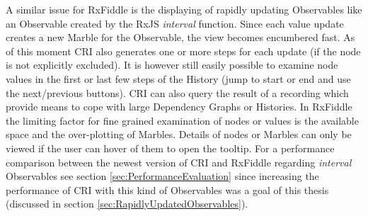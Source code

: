 	A similar issue for RxFiddle is the displaying of rapidly updating Observables like an Observable created by the RxJS \emph{interval} function. Since each value update creates a new Marble for the Observable, the view becomes encumbered fast. As of this moment CRI also generates one or more steps for each update (if the node is not explicitly excluded). It is however still easily possible to examine node values in the first or last few steps of the History (jump to start or end and use the next/previous buttons). CRI can also query the result of a recording which provide means to cope with large Dependency Graphs or Histories. In RxFiddle the limiting factor for  fine grained examination of nodes or values is the available space and the over-plotting of Marbles. Details of nodes or Marbles can only be viewed if the user can hover of them to open the tooltip. For a performance comparison between the newest version of CRI and RxFiddle regarding \emph{interval} Observables see section \ref{sec:PerformanceEvaluation} since increasing the performance of CRI with this kind of Observables was a goal of this thesis (discussed in section \ref{sec:RapidlyUpdatedObservables}).